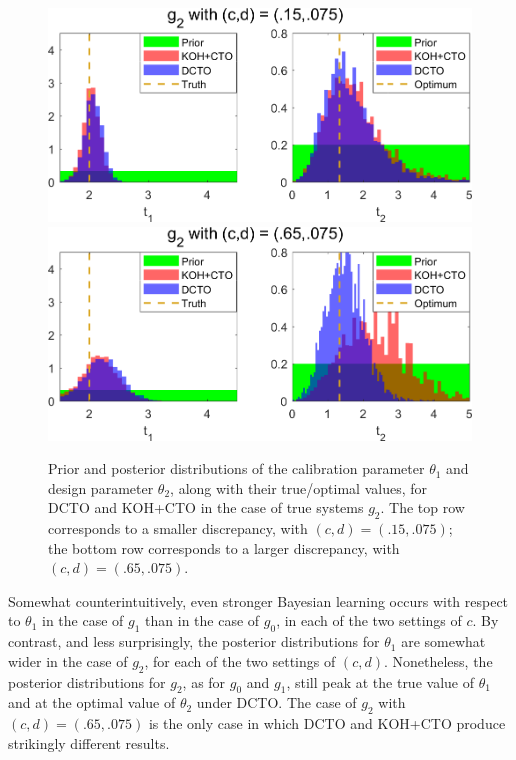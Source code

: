 \documentclass[12pt]{article}
\begin{document}
\begin{figure}
\centering
\includegraphics[scale=0.85]{FIG_KOHCTO_DCTO_comp_discrep3_results}
\includegraphics[scale=0.85]{FIG_KOHCTO_DCTO_comp_discrep4_results}
\captionsetup{width=.85\linewidth}
\caption{Prior and posterior distributions of the calibration parameter $\theta_1$ and design parameter $\theta_2$, along with their true/optimal values, for DCTO and KOH+CTO in the case of true systems $g_2$. The top row corresponds to a smaller discrepancy, with $(c,d)=(.15,.075)$; the bottom row corresponds to a larger discrepancy, with $(c,d)=(.65,.075)$.}
\label{fig:2_discrep_results}
\end{figure}
%
Somewhat counterintuitively, even stronger Bayesian learning occurs with respect to $\theta_1$ in the case of $g_1$ than in the case of $g_0$, in each of the two settings of $c$.
%
By contrast, and less surprisingly, the posterior distributions for $\theta_1$ are somewhat wider in the case of $g_2$, for each of the two settings of $(c,d)$.
%
Nonetheless, the posterior distributions for $g_2$, as for $g_0$ and $g_1$, still peak at the true value of $\theta_1$ and at the optimal value of $\theta_2$ under DCTO.
%
The case of $g_2$ with $(c,d)=(.65,.075)$ is the only case in which DCTO and KOH+CTO produce strikingly different results.
\end{document}
